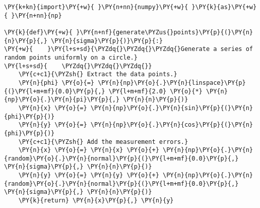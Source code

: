 \begin{Verbatim}[label=\makebox{\href{https://github.com/unipi-physics-labs/statnotes/tree/main/snippy/fit_circle.py}{https://github.com/.../fit\_circle.py}},commandchars=\\\{\}]
\PY{k+kn}{import}\PY{+w}{ }\PY{n+nn}{numpy}\PY{+w}{ }\PY{k}{as}\PY{+w}{ }\PY{n+nn}{np}

\PY{k}{def}\PY{+w}{ }\PY{n+nf}{generate\PYZus{}points}\PY{p}{(}\PY{n}{n}\PY{p}{,} \PY{n}{sigma}\PY{p}{)}\PY{p}{:}
\PY{+w}{    }\PY{l+s+sd}{\PYZdq{}\PYZdq{}\PYZdq{}Generate a series of random points uniformly on a circle.}
\PY{l+s+sd}{    \PYZdq{}\PYZdq{}\PYZdq{}}
    \PY{c+c1}{\PYZsh{} Extract the data points.}
    \PY{n}{phi} \PY{o}{=} \PY{n}{np}\PY{o}{.}\PY{n}{linspace}\PY{p}{(}\PY{l+m+mf}{0.0}\PY{p}{,} \PY{l+m+mf}{2.0} \PY{o}{*} \PY{n}{np}\PY{o}{.}\PY{n}{pi}\PY{p}{,} \PY{n}{n}\PY{p}{)}
    \PY{n}{x} \PY{o}{=} \PY{n}{np}\PY{o}{.}\PY{n}{sin}\PY{p}{(}\PY{n}{phi}\PY{p}{)}
    \PY{n}{y} \PY{o}{=} \PY{n}{np}\PY{o}{.}\PY{n}{cos}\PY{p}{(}\PY{n}{phi}\PY{p}{)}
    \PY{c+c1}{\PYZsh{} Add the measurement errors.}
    \PY{n}{x} \PY{o}{=} \PY{n}{x} \PY{o}{+} \PY{n}{np}\PY{o}{.}\PY{n}{random}\PY{o}{.}\PY{n}{normal}\PY{p}{(}\PY{l+m+mf}{0.0}\PY{p}{,} \PY{n}{sigma}\PY{p}{,} \PY{n}{n}\PY{p}{)}
    \PY{n}{y} \PY{o}{=} \PY{n}{y} \PY{o}{+} \PY{n}{np}\PY{o}{.}\PY{n}{random}\PY{o}{.}\PY{n}{normal}\PY{p}{(}\PY{l+m+mf}{0.0}\PY{p}{,} \PY{n}{sigma}\PY{p}{,} \PY{n}{n}\PY{p}{)}
    \PY{k}{return} \PY{n}{x}\PY{p}{,} \PY{n}{y}


\end{Verbatim}
